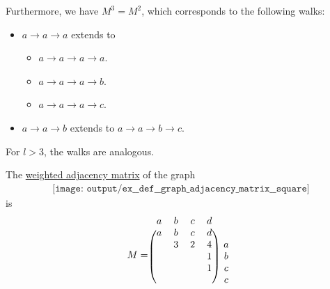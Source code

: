 \begin{example}
\begin{thmenum}
    Furthermore, we have \( M^3 = M^2 \), which corresponds to the following walks:
    \begin{itemize}
      \item \( a \to a \to a \) extends to
      \begin{itemize}
        \item \( a \to a \to a \to a \).
        \item \( a \to a \to a \to b \).
        \item \( a \to a \to a \to c \).
      \end{itemize}
      \item \( a \to a \to b \) extends to \( a \to a \to b \to c \).
    \end{itemize}

    For \( l > 3 \), the walks are analogous.

     The \hyperref[def:graph_adjacency_matrix]{weighted adjacency matrix} of the graph
    \begin{equation}\label{eq:ex:def:graph_adjacency_matrix/square/graph}
      \begin{aligned}
        \texttt{[image: output/ex\_\_def\_\_graph\_adjacency\_matrix\_\_square]}
      \end{aligned}
    \end{equation}
    is
    \begin{equation}\label{eq:ex:def:graph_adjacency_matrix/square/graph/matrix}
      M =
      \begin{blockarray}{*{4}{c} c}
        a & b & c & d &  \\
      \begin{block}{(*{4}{c}) c}
        a & b & c & d &   \\
          & 3 & 2 & 4 & a \\
          &   &   & 1 & b \\
          &   &   & 1 & c \\
          &   &   &   & c \\
      \end{block}
      \end{blockarray}
    \end{equation}


\end{thmenum}
\end{example}
